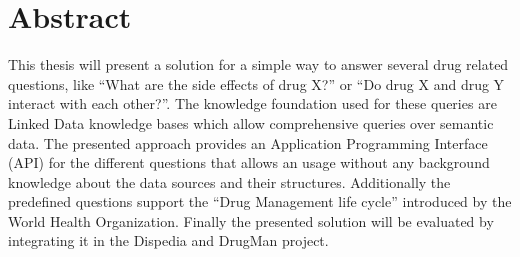 \section*{Abstract}
This thesis will present a solution for a simple way to answer several drug related questions, like ``What are the side effects of drug X?'' or ``Do drug X and drug Y interact with each other?''.
The knowledge foundation used for these queries are Linked Data knowledge bases which allow comprehensive queries over semantic data.
The presented approach provides an Application Programming Interface (API) for the different questions that allows an usage without any background knowledge about the data sources and their structures.
Additionally the predefined questions support the ``Drug Management life cycle'' introduced by the World Health Organization.
Finally the presented solution will be evaluated by integrating it in the Dispedia and DrugMan project.

